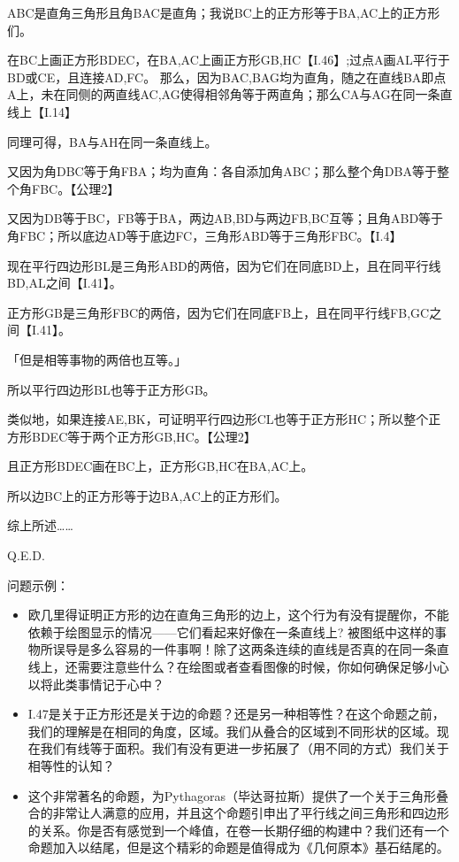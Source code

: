 \documentclass[
]{book}
\providecommand{\tightlist}{%
  \setlength{\itemsep}{0pt}\setlength{\parskip}{0pt}}
\begin{document}
ABC是直角三角形且角BAC是直角；我说BC上的正方形等于BA,AC上的正方形们。

在BC上画正方形BDEC，在BA,AC上画正方形GB,HC【I.46】;过点A画AL平行于BD或CE，且连接AD,FC。
那么，因为BAC,BAG均为直角，随之在直线BA即点A上，未在同侧的两直线AC,AG使得相邻角等于两直角；那么CA与AG在同一条直线上【I.14】

同理可得，BA与AH在同一条直线上。

又因为角DBC等于角FBA；均为直角：各自添加角ABC；那么整个角DBA等于整个角FBC。【公理2】

又因为DB等于BC，FB等于BA，两边AB,BD与两边FB,BC互等；且角ABD等于角FBC；所以底边AD等于底边FC，三角形ABD等于三角形FBC。【I.4】

现在平行四边形BL是三角形ABD的两倍，因为它们在同底BD上，且在同平行线BD,AL之间【I.41】。

正方形GB是三角形FBC的两倍，因为它们在同底FB上，且在同平行线FB,GC之间【I.41】。

「但是相等事物的两倍也互等。」

所以平行四边形BL也等于正方形GB。

类似地，如果连接AE,BK，可证明平行四边形CL也等于正方形HC；所以整个正方形BDEC等于两个正方形GB,HC。【公理2】

且正方形BDEC画在BC上，正方形GB,HC在BA,AC上。

所以边BC上的正方形等于边BA,AC上的正方形们。

综上所述\ldots\ldots{}

Q.E.D.

问题示例：

\begin{itemize}
\tightlist
\item
  欧几里得证明正方形的边在直角三角形的边上，这个行为有没有提醒你，不能依赖于绘图显示的情况------它们看起来好像在一条直线上? 被图纸中这样的事物所误导是多么容易的一件事啊！除了这两条连续的直线是否真的在同一条直线上，还需要注意些什么？在绘图或者查看图像的时候，你如何确保足够小心以将此类事情记于心中？
\item
  I.47是关于正方形还是关于边的命题？还是另一种相等性？在这个命题之前，我们的理解是在相同的角度，区域。我们从叠合的区域到不同形状的区域。现在我们有线等于面积。我们有没有更进一步拓展了（用不同的方式）我们关于相等性的认知？
\item
  这个非常著名的命题，为Pythagoras（毕达哥拉斯）提供了一个关于三角形叠合的非常让人满意的应用，并且这个命题引申出了平行线之间三角形和四边形的关系。你是否有感觉到一个峰值，在卷一长期仔细的构建中？我们还有一个命题加入以结尾，但是这个精彩的命题是值得成为《几何原本》基石结尾的。
\end{itemize}
\end{document}
